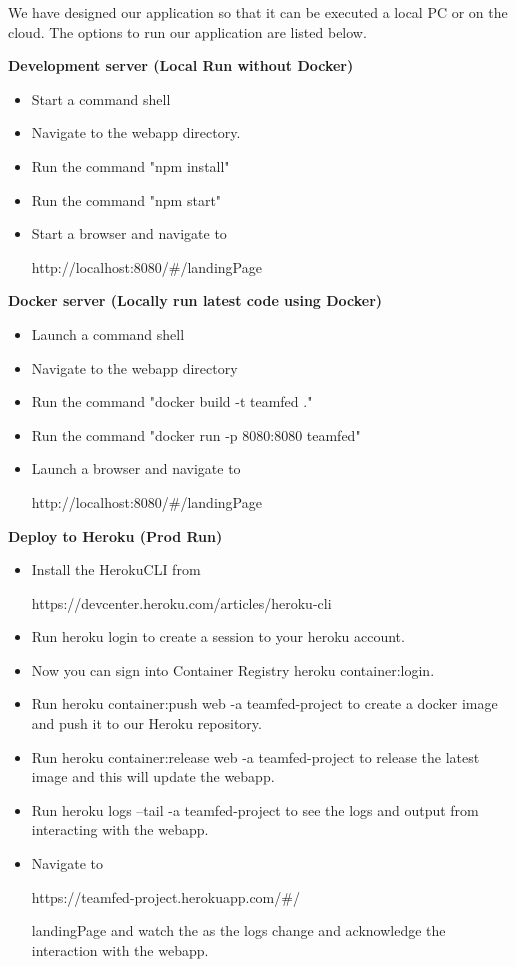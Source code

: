 \documentclass[sigconf,nonacm,11pt]{acmart}
\begin{document}
We have designed our application so that it can be executed a local PC or on the cloud.  The options to run our application are listed below.
\vspace{0.5em}

\textbf{Development server (Local Run without Docker)}
\begin{itemize}
\item Start a command shell
\item Navigate to the webapp directory.
\item Run the command "npm install" 
\item Run the command "npm start"
\item Start a browser and navigate to

http://localhost:8080/\#/landingPage
\end{itemize}


\textbf{Docker server (Locally run latest code using Docker)}
\begin{itemize}
\item Launch a command shell
\item Navigate to the webapp directory
\item Run the command "docker build -t teamfed ."
\item Run the command "docker run -p 8080:8080 teamfed" 
\item  Launch a browser and navigate to 

http://localhost:8080/\#/landingPage
\end{itemize}

\vspace{0.5em}
\textbf{Deploy to Heroku (Prod Run)}
\begin{itemize}
\item Install the HerokuCLI from

https://devcenter.heroku.com/articles/heroku-cli
\item Run heroku login to create a session to your heroku account.
\item Now you can sign into Container Registry heroku container:login.
\item Run heroku container:push web -a teamfed-project to create a docker image and push it to our Heroku repository.
\item Run heroku container:release web -a teamfed-project to release the latest image and this will update the webapp.
\item Run heroku logs --tail -a teamfed-project to see the logs and output from interacting with the webapp.
\item Navigate to 

https://teamfed-project.herokuapp.com/\#/

landingPage and watch the as the logs change and acknowledge the interaction with the webapp.
\end{itemize}
\end{document}

